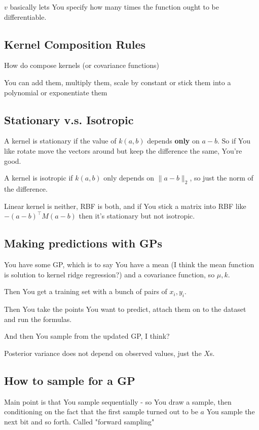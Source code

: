 \documentclass{article}
\begin{document}
			$v$ basically lets You specify how many times the function ought to be differentiable.
		
	\subsection{Kernel Composition Rules}
	
		How do compose kernels (or covariance functions)
		
		You can add them, multiply them, scale by constant or stick them into a polynomial or exponentiate them
		
	\subsection{Stationary v.s. Isotropic}
	
		A kernel is stationary if the value of $k(a, b)$ depends \textbf{only} on $a-b$. So if You like rotate move the vectors around but keep the difference the same, You're good.
		
		A kernel is isotropic if $k(a, b)$ only depends on $\|a-b\|_2$, so just the norm of the difference.
		
		Linear kernel is neither, RBF is both, and if You stick a matrix into RBF like $-(a-b)^\top M (a-b)$ then it's stationary but not isotropic.
		
	\subsection{Making predictions with GPs}
	
		You have some GP, which is to say You have a mean (I think the mean function is solution to kernel ridge regression?) and a covariance function, so $\mu, k$. 
		
		Then You get a training set with a bunch of pairs of $x_i, y_i$.
		
		Then You take the points You want to predict, attach them on to the dataset and run the formulas.
		
		And then You sample from the updated GP, I think?
		
		Posterior variance does not depend on observed values, just the $X$s.
		
	\subsection{How to sample for a GP}
	
		Main point is that You sample sequentially - so You draw a sample, then conditioning on the fact that the first sample turned out to be $a$ You sample the next bit and so forth. Called "forward sampling"
		
\end{document}
